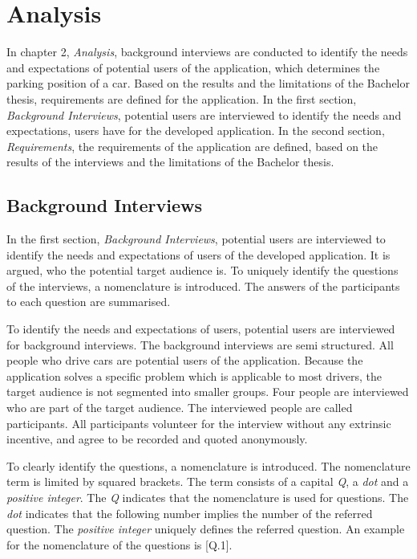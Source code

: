 \chapter{Analysis}
In chapter 2, \textit{Analysis}, background interviews are conducted to identify the needs and expectations of potential users of the application, which determines the parking position of a car. Based on the results and the limitations of the Bachelor thesis, requirements are defined for the application.
In the first section, \textit{Background Interviews}, potential users are interviewed to identify the needs and expectations, users have for the developed application.
In the second section, \textit{Requirements}, the requirements of the application are defined, based on the results of the interviews and the limitations of the Bachelor thesis.

\section{Background Interviews}
In the first section, \textit{Background Interviews}, potential users are interviewed to identify the needs and expectations of  users of the developed application. It is argued, who the potential target audience is. To uniquely identify the questions of the interviews, a nomenclature is introduced. The answers of the participants to each question are summarised.

To identify the needs and expectations of users, potential users are interviewed for background interviews. The background interviews are semi structured. All people who drive cars are potential users of the application. Because the application solves a specific problem which is applicable to most drivers, the target audience is not segmented into smaller groups. Four people are interviewed who are part of the target audience. The interviewed people are called participants. All participants volunteer for the interview without any extrinsic incentive, and agree to be recorded and quoted anonymously. \cite{Abras2004} \cite{wilson2013interview}


To clearly identify the questions, a nomenclature is introduced. The nomenclature term is limited by squared brackets. The term consists of a capital \textit{Q}, a \textit{dot} and a \textit{positive integer}. The \textit{Q} indicates that the nomenclature is used for questions. The \textit{dot} indicates that the following number implies the number of the referred question. The \textit{positive integer} uniquely defines the referred question. An example for the nomenclature of the questions is [Q.1].

